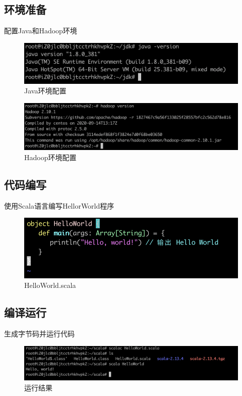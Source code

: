\documentclass{article}
\begin{document}
\subsection{环境准备}
配置Java和Hadoop环境
\begin{figure}[ht]
    \centering
    \includegraphics[width=\textwidth]{img/java.png}
    \caption{Java环境配置}
    \label{fig:enter-label}
\end{figure}

\begin{figure}[ht]
    \centering
    \includegraphics[width=\textwidth]{img/hadoop.png}
    \caption{Hadoop环境配置}
    \label{fig:enter-label}
\end{figure}

\subsection{代码编写}
使用Scala语言编写HellorWorld程序

\begin{figure}[ht]
    \centering
    \includegraphics[width=\textwidth]{img/helloWorld.png}
    \caption{HelloWorld.scala}
    \label{fig:enter-label}
\end{figure}

\subsection{编译运行}
生成字节码并运行代码
\begin{figure}[ht]
    \centering
    \includegraphics[width=\textwidth]{img/run.png}
    \caption{运行结果}
    \label{fig:enter-label}
\end{figure}
\end{document}
